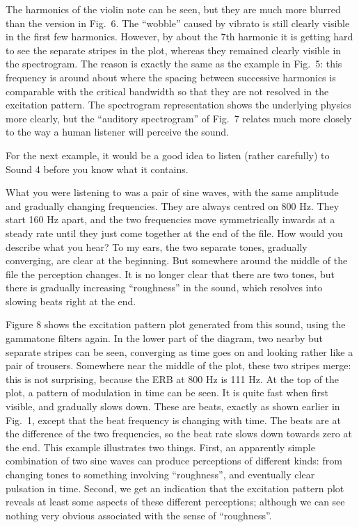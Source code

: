   The harmonics of the violin note can be seen, but they are much more blurred 
  than the version in Fig.\ 6. The ``wobble'' caused by vibrato is still 
  clearly visible in the first few harmonics. However, by about the 7th 
  harmonic it is getting hard to see the separate stripes in the plot, whereas 
  they remained clearly visible in the spectrogram. The reason is exactly the 
  same as the example in Fig.\ 5: this frequency is around about where the 
  spacing between successive harmonics is comparable with the critical 
  bandwidth so that they are not resolved in the excitation pattern. The 
  spectrogram representation shows the underlying physics more clearly, but the 
  ``auditory spectrogram'' of Fig.\ 7 relates much more closely to the way a 
  human listener will perceive the sound. 

  For the next example, it would be a good idea to listen (rather carefully) to 
  Sound 4 before you know what it contains. 

  What you were listening to was a pair of sine waves, with the same amplitude 
  and gradually changing frequencies. They are always centred on 800 Hz. They 
  start 160 Hz apart, and the two frequencies move symmetrically inwards at a 
  steady rate until they just come together at the end of the file. How would 
  you describe what you hear? To my ears, the two separate tones, gradually 
  converging, are clear at the beginning. But somewhere around the middle of 
  the file the perception changes. It is no longer clear that there are two 
  tones, but there is gradually increasing ``roughness'' in the sound, which 
  resolves into slowing beats right at the end. 

  Figure 8 shows the excitation pattern plot generated from this sound, using 
  the gammatone filters again. In the lower part of the diagram, two nearby but 
  separate stripes can be seen, converging as time goes on and looking rather 
  like a pair of trousers. Somewhere near the middle of the plot, these two 
  stripes merge: this is not surprising, because the ERB at 800 Hz is 111 Hz. 
  At the top of the plot, a pattern of modulation in time can be seen. It is 
  quite fast when first visible, and gradually slows down. These are beats, 
  exactly as shown earlier in Fig.\ 1, except that the beat frequency is 
  changing with time. The beats are at the difference of the two frequencies, 
  so the beat rate slows down towards zero at the end. This example illustrates 
  two things. First, an apparently simple combination of two sine waves can 
  produce perceptions of different kinds: from changing tones to something 
  involving ``roughness'', and eventually clear pulsation in time. Second, we 
  get an indication that the excitation pattern plot reveals at least some 
  aspects of these different perceptions; although we can see nothing very 
  obvious associated with the sense of ``roughness''. 

